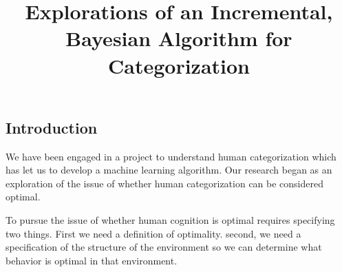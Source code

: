 



\begin{article}





\setcounter{page}{275} %




\title{Explorations of an Incremental, Bayesian Algorithm
for Categorization}







\section{Introduction}
We have been engaged in a project to understand human categorization which
has let us to develop a machine learning algorithm. Our research began as an
exploration of the issue of whether human categorization can be considered
optimal.

To pursue the issue of whether human cognition is optimal requires
specifying two things. First we need a definition of optimality.
second, we need a specification of the structure of the environment
so we can determine what behavior is optimal in that environment.



\end{article}

